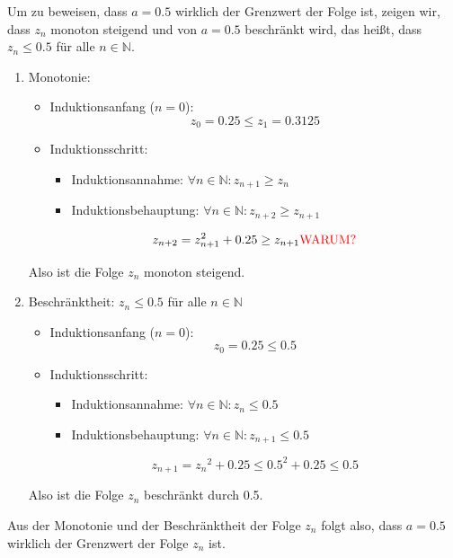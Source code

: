 \documentclass[a4paper, 12pt]{book}
\begin{document}
Um zu beweisen, dass \(a = 0.5\) wirklich der Grenzwert der Folge
ist, zeigen wir, dass \(z_{n}\) monoton steigend und von \(a = 0.5\)
beschränkt wird, das heißt, dass \(z_{n} \leq 0.5\) für alle
\(n\mathbb{ \in N}\).

\begin{enumerate}
\item
  Monotonie:

\begin{itemize}
\item Induktionsanfang (\(n = 0\)):
\[z_{0} = 0.25 \leq z_{1} = 0.3125\]
\item Induktionsschritt:
\begin{itemize}
\item Induktionsannahme: \(\forall n \in \mathbb{N}:z_{n + 1} \geq z_{n}\)
\item Induktionsbehauptung:
\(\forall n \in \mathbb{N}:z_{n + 2} \geq z_{n + 1}\)
\end{itemize}
\[z_{n + 2} = z_{n + 1}^{2} + 0.25 \geq z_{n + 1}\text{\textcolor{red}{WARUM?}}\]
\end{itemize}
Also ist die Folge \(z_{n}\) monoton steigend.

\item
  Beschränktheit: \(z_{n} \leq 0.5\) für alle \(n\mathbb{ \in N}\)
\begin{itemize}
\item Induktionsanfang (\(n = 0\)):
\[z_{0} = 0.25 \leq 0.5\]
\item Induktionsschritt:
\begin{itemize}
\item Induktionsannahme: \(\forall n \in \mathbb{N:}z_{n} \leq 0.5\)
\item Induktionsbehauptung:
\(\forall n \in \mathbb{N:}z_{n + 1} \leq 0.5\)
\end{itemize}
\[z_{n + 1} = {z_{n}}^{2} + 0.25 \leq {0.5}^{2} + 0.25 \leq 0.5\]
\end{itemize}
Also ist die Folge \(z_{n}\) beschränkt durch 0.5.
\end{enumerate}

Aus der Monotonie und der Beschränktheit der Folge \(z_{n}\) folgt also,
dass \(a = 0.5\) wirklich der Grenzwert der Folge \(z_{n}\) ist.
\hfill\blacksquare

\end{document}
